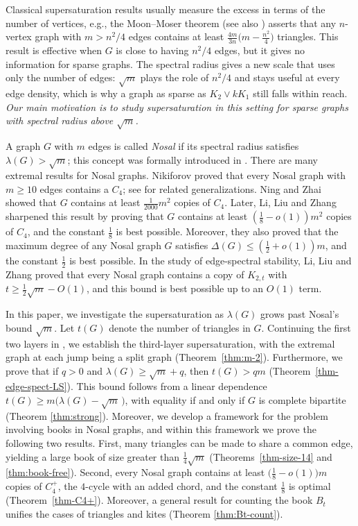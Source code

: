 \documentclass[10pt,a4paper]{amsart}
\renewcommand{\le}{\leqslant}
\renewcommand{\ge}{\geqslant}
\begin{document}
\smallskip 
Classical supersaturation results usually measure the excess in terms of the number of vertices, e.g., the Moon--Moser theorem \cite{MM1962} (see also \cite[page 443]{Lov1979}) asserts that any $n$-vertex 
graph with $m> n^2/4$ edges contains at least
$\frac{4m}{3n}\big(m- \frac{n^2}{4} \big)$ triangles. This result is effective when $G$ is close to having $n^2/4$ edges, but it gives no information for sparse graphs. The spectral radius gives a new scale that uses only the number of
edges: $\sqrt{m}$ plays the role of $ n^2/4 $ and  stays useful at every edge density, which is why a graph as sparse as $K_2\vee kK_1$ still
falls within reach. {\it Our main motivation is to study supersaturation in this setting for sparse graphs with spectral radius above $\sqrt{m}$.}  

\smallskip 
A graph $G$ with $m$ edges is called {\it Nosal} if its spectral radius satisfies $\lambda (G)> \sqrt{m}$; this concept was formally introduced in \cite{LiLiuZhang26}.  
There are many extremal results for Nosal graphs. Nikiforov \cite{Niki2009laa} proved that every Nosal graph with $m\ge 10$ edges contains a $C_4$; see \cite{LNW2021, ZS2022dm, LLZ2025, WL2026} for related generalizations. Ning and Zhai \cite{NZ2021b} showed that $G$ contains at least $\frac{1}{2000}m^2$ copies of $C_4$. Later, Li, Liu and Zhang \cite{LiLiuZhang26} sharpened this result by proving that $G$ contains  at least $(\frac{1}{8} - o(1))m^2$ copies of $C_4$, and the constant $\frac{1}{8}$ is best possible. 
Moreover, they \cite{LiLiuZhang26} also proved that the maximum degree of any Nosal graph $G$ satisfies $\Delta (G)\le (\frac{1}{2} + o(1))m$, and the constant $\frac{1}{2}$ is  best possible. 
In the study of edge-spectral stability, Li, Liu and Zhang \cite{LLZ-edge-spectral} proved that every Nosal graph contains a copy of $K_{2,t}$ with $t\ge \frac{1}{2} \sqrt{m} - O(1)$, and this bound is best possible up to an $O(1)$ term. 

 


\smallskip 
In this paper, 
we investigate the supersaturation as $\lambda(G)$ grows past Nosal's bound $\sqrt{m}$. Let $t(G)$ denote the number
of triangles in $G$. 
Continuing the first two layers in \cite{NingZhai2023, ZZ2026}, 
we establish the third-layer
supersaturation, with the extremal graph at each jump being a split graph (Theorem~\ref{thm:m-2}). Furthermore, we prove that if $q>0$ and $\lambda (G)\ge \sqrt{m} +q$, then $t(G)> qm$ (Theorem~\ref{thm-edge-spect-LS}). This bound follows from a linear dependence $t(G)\ge m\big(\lambda(G)-\sqrt{m}\,\big)$, with equality if and only if $G$ is complete bipartite (Theorem \ref{thm:strong}). Moreover, we develop a  framework for the problem involving books in Nosal graphs, and within this framework we prove the following two results. First, many triangles can be made to share a common edge, yielding a large book of size greater than $\frac{1}{4}\sqrt{m}$ (Theorems~\ref{thm-size-14} and \ref{thm:book-free}). Second, every Nosal graph contains at least $\big(\frac{1}{8} - o(1)\big)m$ copies of $C_4^+$, the $4$-cycle with an added chord, and the constant $\frac{1}{8}$ is optimal (Theorem~\ref{thm-C4+}). 
Moreover, a general result for counting the book $B_t$ unifies the cases of triangles and kites (Theorem \ref{thm:Bt-count}). 
\end{document}

